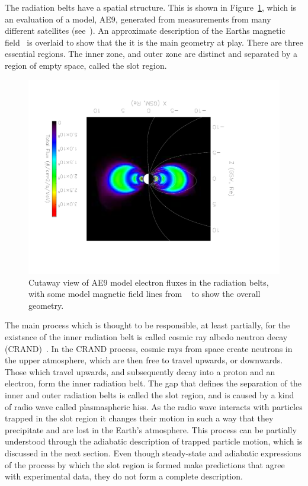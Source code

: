 The radiation belts have a spatial structure. This is shown in Figure~\ref{radbelts_structure}, which is an evaluation of a model, AE9, generated from measurements from many different satellites (see~\cite{ginet2013}). An approximate description of the Earths magnetic field~\citep{tsyganenko97} is overlaid to show that the it is the main geometry at play. There are three essential regions. The inner zone, and outer zone are distinct and separated by a region of empty space, called the slot region.

\begin{figure}[p]
\label{radbelts_structure}
\centering
\includegraphics[width=1.0\textwidth,angle=180]{figures/chapter_2/radbelts_structure/radmodel}
\caption{Cutaway view of AE9 model electron fluxes in the radiation belts, with some model magnetic field lines from ~\cite{tsyganenko97} to show the overall geometry.}
\end{figure}

The main process which is thought to be responsible, at least partially, for the existsnce of the inner radiation belt is called cosmic ray albedo neutron decay (CRAND)~\citep{singer1958}. In the CRAND process, cosmic rays from space create neutrons in the upper atmosphere, which are then free to travel upwards, or downwards. Those which travel upwards, and subsequently decay into a proton and an electron, form the inner radiation belt. The gap that defines the separation of the inner and outer radiation belts is called the slot region, and is caused by a kind of radio wave called plasmaspheric hiss. As the radio wave interacts with particles trapped in the slot region it changes their motion in such a way that they precipitate and are lost in the Earth’s atmosphere. This process can be partially understood through the adiabatic description of trapped particle motion, which is discussed in the next section. Even though steady-state and adiabatic expressions of the process by which the slot region is formed make predictions that agree with experimental data, they do not form a complete description. 

